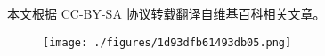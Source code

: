 
本文根据 CC-BY-SA 协议转载翻译自维基百科\href{https://en.wikipedia.org/wiki/Pascual_Jordan}{相关文章}。

\begin{figure}[ht]
\centering
\texttt{[image: ./figures/1d93dfb61493db05.png]}
\caption{} \label{fig_YRD_1}
\end{figure}
